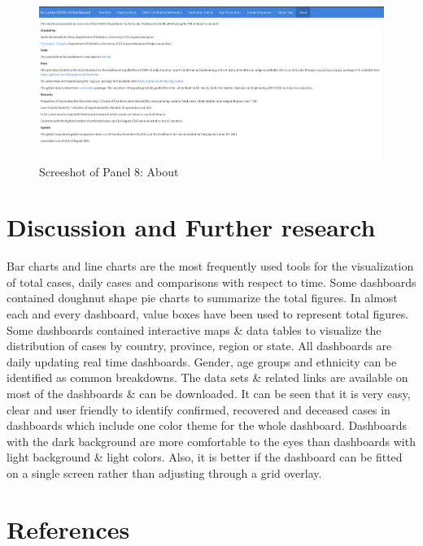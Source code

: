\documentclass[
]{article}
\begin{document}
\begin{figure}

{\centering \includegraphics[width=0.8\linewidth]{Images/image8} 

}

\caption{Screeshot of Panel 8: About}\label{fig:unnamed-chunk-12}
\end{figure}

\newpage

\hypertarget{conclusions}{%
\section{Discussion and Further research}\label{conclusions}}

Bar charts and line charts are the most frequently used tools for the
visualization of total cases, daily cases and comparisons with respect
to time. Some dashboards contained doughnut shape pie charts to
summarize the total figures. In almost each and every dashboard, value
boxes have been used to represent total figures. Some dashboards
contained interactive maps \& data tables to visualize the distribution
of cases by country, province, region or state. All dashboards are daily
updating real time dashboards. Gender, age groups and ethnicity can be
identified as common breakdowns. The data sets \& related links are
available on most of the dashboards \& can be downloaded. It can be seen
that it is very easy, clear and user friendly to identify confirmed,
recovered and deceased cases in dashboards which include one color theme
for the whole dashboard. Dashboards with the dark background are more
comfortable to the eyes than dashboards with light background \& light
colors. Also, it is better if the dashboard can be fitted on a single
screen rather than adjusting through a grid overlay.

\hypertarget{references}{%
\section{References}\label{references}}
\end{document}

